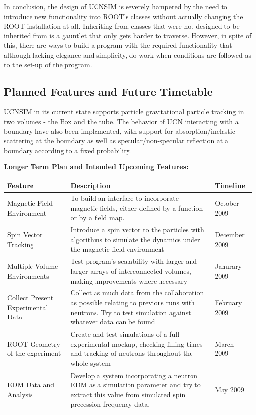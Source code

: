 \documentclass[11pt,a4paper,oneside]{article}
\begin{document}
In conclusion, the design of UCNSIM is severely hampered by the need to introduce new functionality into ROOT's classes without actually changing the ROOT installation at all. Inheriting from classes that were not designed to be inherited from is a gauntlet that only gets harder to traverse. However, in spite of this, there are ways to build a program with the required functionality that although lacking elegance and simplicity, do work when conditions are followed as to the set-up of the program. 

\subsection{Planned Features and Future Timetable}

UCNSIM in its current state supports particle gravitational particle tracking in two volumes - the Box and the tube. The behavior of UCN interacting with a boundary have also been implemented, with support for absorption/inelastic scattering at the boundary as well as specular/non-specular reflection at a boundary according to a fixed probability. 

\textbf{Longer Term Plan and Intended Upcoming Features:} \\

\begin{center}
    \begin{tabular}{ | p{3cm} | p{8cm} | l |}
    \hline
    Feature & Description & Timeline \\ \hline
    Magnetic Field Environment & To build an interface to incorporate magnetic fields, either defined by a function or by a field map. & October 2009 \\ \hline
    Spin Vector Tracking & Introduce a spin vector to the particles with algorithms to simulate the dynamics under the magnetic field environment & December 2009 \\ \hline
	 Multiple Volume Environments & Test program's scalability with larger and larger arrays of interconnected volumes, making improvements where necessary & Janurary 2009 \\ \hline
	 Collect Present Experimental Data & Collect as much data from the collaboration as possible relating to previous runs with neutrons. Try to test simulation against whatever data can be found & February 2009 \\ \hline
	 ROOT Geometry of the experiment & Create and test simulations of a full experimental mockup, checking filling times and tracking of neutrons throughout the whole system & March 2009 \\ \hline
	 EDM Data and Analysis & Develop a system incorporating a neutron EDM as a simulation parameter and try to extract this value from simulated spin precession frequency data. & May 2009 \\ \hline
    \end{tabular}
\end{center}
\end{document}

